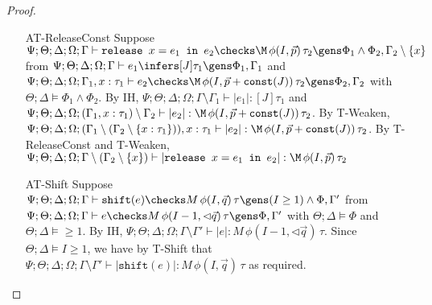 \begin{proof}
\begin{enumerate}
  \item[AT-ReleaseConst] Suppose $\Psi ; \Theta ; \Delta ; \Omega ; \Gamma \vdash \texttt{release } x = e_1 \texttt{ in }e_2 \checks \M \, \phi(I,\vec{p}) \, \tau_2 \gens \Phi_1 \wedge \Phi_2, \Gamma_2 \setminus \{x\}$
  from $\Psi ; \Theta ; \Delta ; \Omega ; \Gamma \vdash e_1 \infers [J] \tau_1 \gens \Phi_1,\Gamma_1$
  and $\Psi ; \Theta ; \Delta ; \Omega ; \Gamma_1, x : \tau_1 \vdash e_2 \checks \M \, \phi(I,\vec{p} + \texttt{const}(J)) \, \tau_2 \gens \Phi_2, \Gamma_2$
  with $\Theta ; \Delta \vDash \Phi_1 \wedge \Phi_2$.
  By IH, $\Psi ; \Theta ; \Delta ; \Omega ; \Gamma \setminus \Gamma_1 \vdash |e_1| : [J] \tau_1$
  and $\Psi ; \Theta ; \Delta ; \Omega ; (\Gamma_1, x : \tau_1) \setminus \Gamma_2 \vdash |e_2| : \M \, \phi(I,\vec{p} + \texttt{const}(J)) \, \tau_2$. By T-Weaken,
  $\Psi ; \Theta ; \Delta ; \Omega ; (\Gamma_1 \setminus (\Gamma_2 \setminus \{x : \tau_1\})), x :\tau_1\vdash |e_2| : \M \, \phi(I,\vec{p} + \texttt{const}(J)) \, \tau_2$. By T-ReleaseConst and T-Weaken, 
  $\Psi ; \Theta ; \Delta ; \Omega ; \Gamma \setminus (\Gamma_2 \setminus \{x\}) \vdash |\texttt{release } x = e_1 \texttt{ in }e_2| : \M \, \phi(I,\vec{p}) \, \tau_2$

  \item[AT-Shift] Suppose $\Psi ; \Theta ; \Delta ; \Omega ; \Gamma \vdash \texttt{shift}(e) \checks M \, \phi(I,\vec{q}) \, \tau \gens (I \geq 1) \wedge \Phi, \Gamma'$ from $\Psi ; \Theta ; \Delta  ; \Omega ; \Gamma \vdash e \checks M \, \phi(I - 1,\lhd \vec{q}) \, \tau \gens \Phi, \Gamma'$ with $\Theta ; \Delta \vDash \Phi$ and $\Theta ; \Delta \vDash  \geq 1$. By IH, $\Psi ; \Theta ; \Delta  ; \Omega ; \Gamma \setminus \Gamma' \vdash |e| : M \, \phi(I - 1,\lhd \vec{q}) \, \tau$. Since $\Theta ; \Delta \vDash I \geq 1$, we have by T-Shift that $\Psi ; \Theta ; \Delta ; \Omega ; \Gamma \setminus \Gamma' \vdash |\texttt{shift}(e)| : M \, \phi(I,\vec{q}) \, \tau$ as required.
  

\end{enumerate}
\end{proof}
